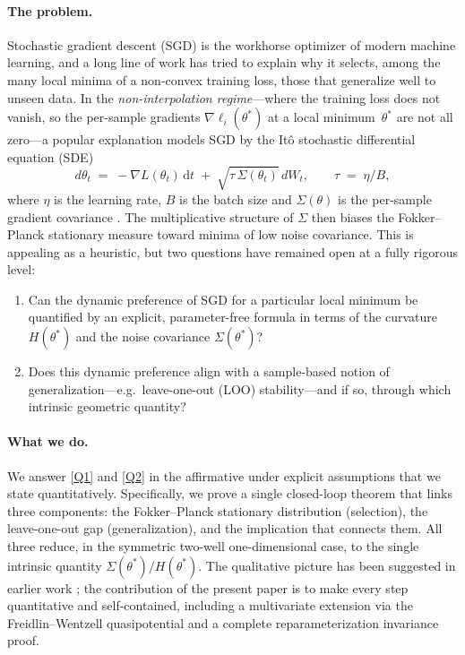 \documentclass[11pt,a4paper]{article}
\theoremstyle{definition}
\theoremstyle{remark}
\newcommand{\dif}{\,\mathrm{d}}
\begin{document}
\paragraph{The problem.}
Stochastic gradient descent (SGD) is the workhorse optimizer of modern
machine learning, and a long line of work has tried to explain why it
selects, among the many local minima of a non-convex training loss, those
that generalize well to unseen data.  In the \emph{non-interpolation
regime}---where the training loss does not vanish, so the per-sample
gradients $\nabla\ell_i(\theta^*)$ at a local minimum~$\theta^*$ are not all
zero---a popular explanation models SGD by the It\^o stochastic
differential equation (SDE)
\[
   d\theta_t \;=\; -\nabla L(\theta_t)\dif t
                  \;+\; \sqrt{\tau\,\Sigma(\theta_t)}\,dW_t,
   \qquad
   \tau \;=\; \eta/B,
\]
where $\eta$ is the learning rate, $B$ is the batch size and
$\Sigma(\theta)$ is the per-sample gradient covariance
\cite{LiTaiE2017,SmithLe2018,MandtHoffmanBlei2017,ChaudhariSoatto2018}.  The
multiplicative structure of $\Sigma$ then biases the Fokker--Planck
stationary measure toward minima of low noise covariance.  This is
appealing as a heuristic, but two questions have remained open at a fully
rigorous level:
\begin{enumerate}[label=(Q\arabic*),leftmargin=2.6em]
\item \label{Q1}
   Can the dynamic preference of SGD for a particular local minimum be
   quantified by an explicit, parameter-free formula in terms of the
   curvature $H(\theta^*)$ and the noise covariance $\Sigma(\theta^*)$?
\item \label{Q2}
   Does this dynamic preference align with a sample-based notion of
   generalization---e.g.\ leave-one-out (LOO) stability---and if so,
   through which intrinsic geometric quantity?
\end{enumerate}

\paragraph{What we do.}
We answer \ref{Q1} and \ref{Q2} in the affirmative under explicit assumptions
that we state quantitatively.  Specifically, we prove a single closed-loop
theorem that links three components: the Fokker--Planck stationary
distribution (selection), the leave-one-out gap (generalization), and the
implication that connects them.  All three reduce, in the symmetric
two-well one-dimensional case, to the single intrinsic quantity
$\Sigma(\theta^*)/H(\theta^*)$.  The qualitative picture has been suggested
in earlier work \cite{ChaudhariSoatto2018,SmithLe2018,HaoChen2021}; the
contribution of the present paper is to make every step quantitative and
self-contained, including a multivariate extension via the
Freidlin--Wentzell quasipotential and a complete reparameterization
invariance proof.
\end{document}

